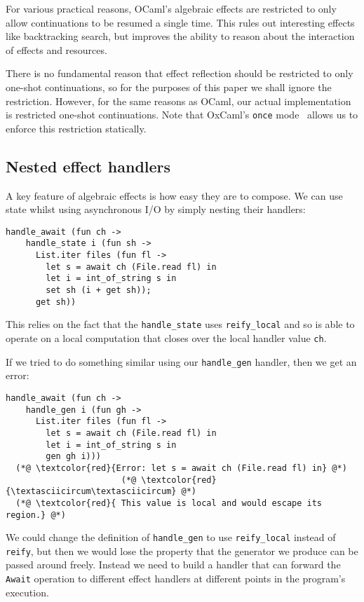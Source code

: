 \documentclass[acmsmall, screen, review, anonymous]{acmart}
\theoremstyle{definition}
\begin{document}
For various practical reasons, OCaml's algebraic effects are restricted
to only allow continuations to be resumed a single time. This rules out
interesting effects like backtracking search, but improves the ability
to reason about the interaction of effects and resources.

There is no fundamental reason that effect reflection should be
restricted to only one-shot continuations, so for the purposes of this
paper we shall ignore the restriction. However, for the same reasons as
OCaml, our actual implementation is restricted one-shot
continuations. Note that OxCaml's \lstinline[style=oxcaml]{once}
mode~\cite{lorenzen2024oxidizing} allows us to enforce this restriction
statically.

\subsection{Nested effect handlers}

A key feature of algebraic effects is how easy they are to compose. We
can use state whilst using asynchronous I/O by simply nesting their
handlers:
\begin{lstlisting}[style=oxcaml]
  handle_await (fun ch ->
    handle_state i (fun sh ->
      List.iter files (fun fl ->
        let s = await ch (File.read fl) in
        let i = int_of_string s in
        set sh (i + get sh));
      get sh))
\end{lstlisting}

This relies on the fact that the \lstinline[style=oxcaml]{handle_state}
uses \lstinline[style=oxcaml]{reify_local} and so is able to operate on a
local computation that closes over the local handler value
\lstinline[style=oxcaml]{ch}.

If we tried to do something similar using our
\lstinline[style=oxcaml]{handle_gen} handler, then we get an error:
\begin{lstlisting}[style=oxcaml]
  handle_await (fun ch ->
    handle_gen i (fun gh ->
      List.iter files (fun fl ->
        let s = await ch (File.read fl) in
        let i = int_of_string s in
        gen gh i)))
  (*@ \textcolor{red}{Error: let s = await ch (File.read fl) in} @*)
                       (*@ \textcolor{red}{\textasciicircum\textasciicircum} @*)
  (*@ \textcolor{red}{ This value is local and would escape its region.} @*)
\end{lstlisting}

We could change the definition of \lstinline[style=oxcaml]{handle_gen} to
use \lstinline[style=oxcaml]{reify_local} instead of
\lstinline[style=oxcaml]{reify}, but then we would lose the property that
the generator we produce can be passed around freely. Instead we need to
build a handler that can forward the \lstinline[style=oxcaml]{Await}
operation to different effect handlers at different points in the
program's execution.
\end{document}
